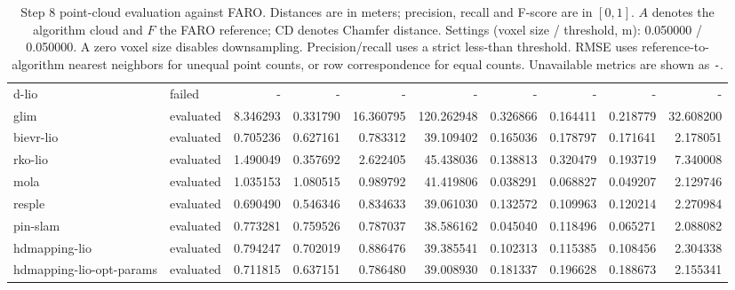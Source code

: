 \documentclass{article}
\begin{document}
\begin{table}[htbp]
\begin{tabular}{llrrrrrrrr}
d-lio & failed & - & - & - & - & - & - & - & - \\
glim & evaluated & 8.346293 & 0.331790 & 16.360795 & 120.262948 & 0.326866 & 0.164411 & 0.218779 & 32.608200 \\
bievr-lio & evaluated & 0.705236 & 0.627161 & 0.783312 & 39.109402 & 0.165036 & 0.178797 & 0.171641 & 2.178051 \\
rko-lio & evaluated & 1.490049 & 0.357692 & 2.622405 & 45.438036 & 0.138813 & 0.320479 & 0.193719 & 7.340008 \\
mola & evaluated & 1.035153 & 1.080515 & 0.989792 & 41.419806 & 0.038291 & 0.068827 & 0.049207 & 2.129746 \\
resple & evaluated & 0.690490 & 0.546346 & 0.834633 & 39.061030 & 0.132572 & 0.109963 & 0.120214 & 2.270984 \\
pin-slam & evaluated & 0.773281 & 0.759526 & 0.787037 & 38.586162 & 0.045040 & 0.118496 & 0.065271 & 2.088082 \\
hdmapping-lio & evaluated & 0.794247 & 0.702019 & 0.886476 & 39.385541 & 0.102313 & 0.115385 & 0.108456 & 2.304338 \\
hdmapping-lio-opt-params & evaluated & 0.711815 & 0.637151 & 0.786480 & 39.008930 & 0.181337 & 0.196628 & 0.188673 & 2.155341 \\
\hline
\end{tabular}
\caption{Step 8 point-cloud evaluation against FARO. Distances are in meters; precision, recall and F-score are in $[0,1]$. $A$ denotes the algorithm cloud and $F$ the FARO reference; CD denotes Chamfer distance. Settings (voxel size / threshold, m): 0.050000 / 0.050000. A zero voxel size disables downsampling. Precision/recall uses a strict less-than threshold. RMSE uses reference-to-algorithm nearest neighbors for unequal point counts, or row correspondence for equal counts. Unavailable metrics are shown as \texttt{-}.}
\label{tab:step8-point-cloud-evaluation}
\end{table}

\vspace*{\fill}
\end{document}
